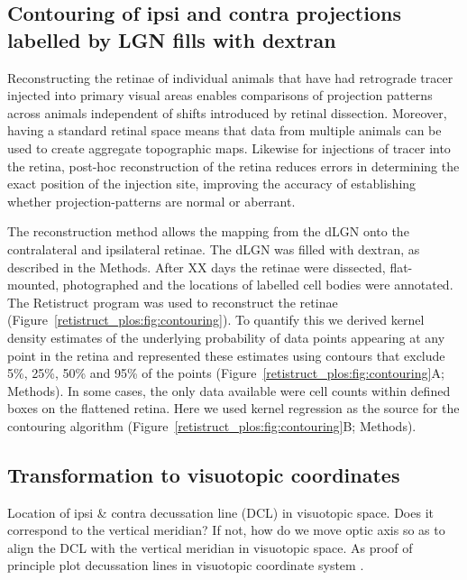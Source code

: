 \documentclass[10pt]{article}
\begin{document}
\subsection*{Contouring of ipsi and contra projections labelled by LGN
  fills with dextran}

Reconstructing the retinae of individual animals that have had
retrograde tracer injected into primary visual areas enables
comparisons of projection patterns across animals independent of
shifts introduced by retinal dissection. Moreover, having a standard
retinal space means that data from multiple animals can be used to
create aggregate topographic maps. Likewise for injections of tracer
into the retina, post-hoc reconstruction of the retina reduces errors
in determining the exact position of the injection site, improving the
accuracy of establishing whether projection-patterns are normal or
aberrant.

The reconstruction method allows the mapping from the dLGN onto the
contralateral and ipsilateral retinae. The dLGN was filled with
dextran, as described in the Methods. After XX days the retinae were
dissected, flat-mounted, photographed and the locations of labelled
cell bodies were annotated. The Retistruct program was used to
reconstruct the retinae (Figure~\ref{retistruct_plos:fig:contouring}).
To quantify this we derived kernel density estimates of the underlying
probability of data points appearing at any point in the retina and
represented these estimates using contours that exclude 5\%, 25\%,
50\% and 95\% of the points
(Figure~\ref{retistruct_plos:fig:contouring}A; Methods). In some
cases, the only data available were cell counts within defined boxes
on the flattened retina. Here we used kernel regression as the source
for the contouring algorithm
(Figure~\ref{retistruct_plos:fig:contouring}B; Methods).


\subsection*{Transformation to visuotopic coordinates}
\label{retistruct_plos:sec:transf-visu-coord}

Location of ipsi \& contra decussation line (DCL) in visuotopic
space. Does it correspond to the vertical meridian? If not, how do we
move optic axis so as to align the DCL with the vertical meridian in
visuotopic space. As proof of principle plot decussation lines in
visuotopic coordinate system \cite{BishEtal62some}.
\end{document}
